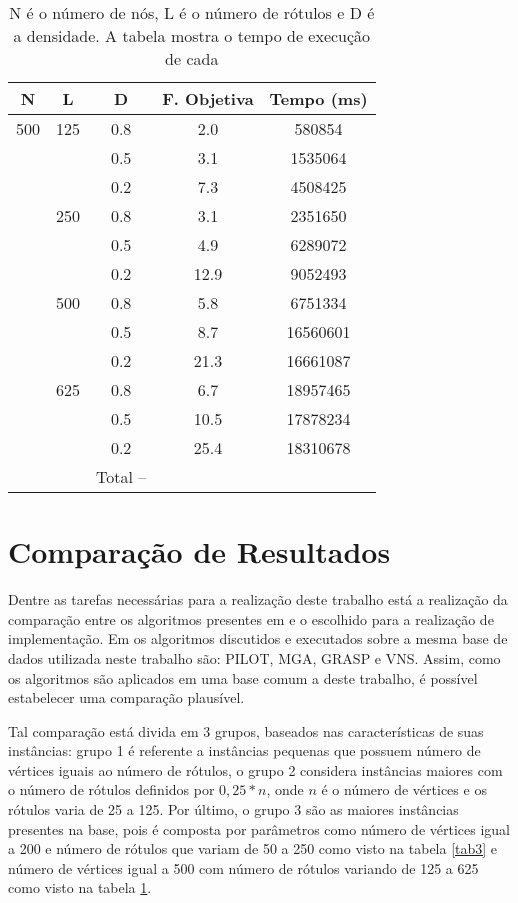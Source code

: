 \documentclass{sig-alternate-05-2015}
\begin{document}
\begin{table}[!h]
	\begin{tabular}{ccccc}
		\hline \rule[-2ex]{0pt}{5.5ex} N & L & D  & F. Objetiva & Tempo (ms) \\ 
		\hline \rule[-2ex]{0pt}{5.5ex} 500 & 125 & 0.8 & 2.0 & 580854 \\ 
		\hline \rule[-2ex]{0pt}{5.5ex}  &  & 0.5 & 3.1 & 1535064 \\ 
		\hline \rule[-2ex]{0pt}{5.5ex}  &  & 0.2 & 7.3 & 4508425 \\ 
		\hline \rule[-2ex]{0pt}{5.5ex}  & 250 & 0.8 & 3.1 & 2351650 \\ 
		\hline \rule[-2ex]{0pt}{5.5ex}  &  & 0.5 & 4.9 & 6289072 \\ 
		\hline \rule[-2ex]{0pt}{5.5ex}  &  & 0.2 & 12.9 & 9052493 \\ 
		\hline \rule[-2ex]{0pt}{5.5ex}  & 500 & 0.8 & 5.8 & 6751334 \\ 
		\hline \rule[-2ex]{0pt}{5.5ex}  &  & 0.5 & 8.7 & 16560601 \\ 
		\hline \rule[-2ex]{0pt}{5.5ex}  &  & 0.2 & 21.3 & 16661087 \\ 
		\hline \rule[-2ex]{0pt}{5.5ex}  & 625 & 0.8 & 6.7 & 18957465 \\ 
		\hline \rule[-2ex]{0pt}{5.5ex}  &  & 0.5 & 10.5 & 17878234 \\ 
		\hline \rule[-2ex]{0pt}{5.5ex}  &  & 0.2 & 25.4 & 18310678 \\ 
		\hline \rule[-2ex]{0pt}{5.5ex}  &  & Total -- &  &  \\ 
		\hline 
	\end{tabular}  
	\caption{N é o número de nós, L é o número de rótulos e D é a densidade.  A tabela mostra o tempo de execução de cada}
	\label{tab4}
\end{table}
\section{Comparação de Resultados} \label{sec5}
Dentre as tarefas necessárias para a realização deste trabalho está a realização da comparação entre os algoritmos presentes em \cite{consoli2009greedy} e o escolhido para a realização de implementação. Em \cite{consoli2009greedy} os algoritmos discutidos e executados sobre a mesma base de dados utilizada neste trabalho são: PILOT, MGA, GRASP e VNS. Assim, como os algoritmos são aplicados em uma base comum a deste trabalho, é possível estabelecer uma comparação plausível. 

Tal comparação está divida em 3 grupos, baseados nas características de suas instâncias: grupo 1 é referente a instâncias pequenas que possuem número de vértices iguais ao número de rótulos, o grupo 2 considera instâncias maiores com o número de rótulos definidos por $0,25 * n$, onde $n$ é o número de vértices e os rótulos varia de 25 a 125. Por último, o grupo 3 são as maiores instâncias presentes na base, pois é composta por parâmetros como número de vértices igual a 200 e número de rótulos que variam de 50 a 250 como visto na tabela \ref{tab3} e número de vértices igual a 500 com número de rótulos variando de 125 a 625 como visto na tabela \ref{tab4}.
\end{document}
